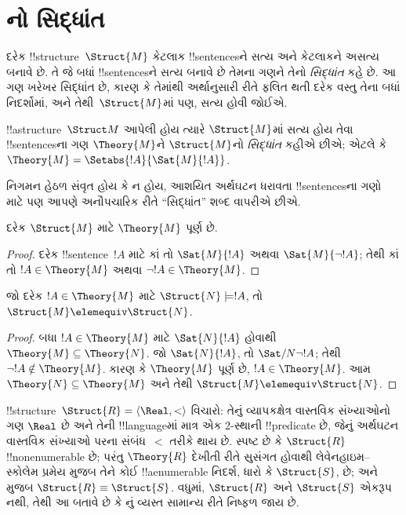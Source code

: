 \documentclass[../../../include/open-logic-section]{subfiles}
\begin{document}

\section{નો સિદ્ધાંત}

દરેક !!{structure}~$\Struct{M}$ કેટલાક !!{sentence}sને સત્ય અને
કેટલાકને અસત્ય બનાવે છે. તે જે બધાં !!{sentence}sને સત્ય બનાવે છે
તેમના ગણને તેનો \emph{સિદ્ધાંત} કહે છે. આ ગણ ખરેખર સિદ્ધાંત છે, કારણ કે
તેમાંથી અર્થાનુસારી રીતે ફલિત થતી દરેક વસ્તુ તેના બધાં નિદર્શોમાં,
અને તેથી~$\Struct{M}$માં પણ, સત્ય હોવી જોઈએ.

\begin{defn}
  !!a{structure}~$\Struct M$ આપેલી હોય ત્યારે $\Struct{M}$માં સત્ય
  હોય તેવા !!{sentence}sના ગણ $\Theory{M}$ને $\Struct{M}$નો
  \emph{સિદ્ધાંત} કહીએ છીએ; એટલે કે $\Theory{M} =
  \Setabs{!A}{\Sat{M}{!A}}$.
\end{defn}

નિગમન હેઠળ સંવૃત હોય કે ન હોય, આશયિત અર્થઘટન ધરાવતા
!!{sentence}sના ગણો માટે પણ આપણે અનૌપચારિક રીતે ``સિદ્ધાંત'' શબ્દ વાપરીએ છીએ.

\begin{prop}
દરેક $\Struct{M}$ માટે $\Theory{M}$ પૂર્ણ છે.
\end{prop}

\begin{proof}
દરેક !!{sentence}~$!A$ માટે કાં તો $\Sat{M}{!A}$ અથવા
$\Sat{M}{\lnot !A}$; તેથી કાં તો $!A \in \Theory{M}$ અથવા
$\lnot !A \in \Theory{M}$.
\end{proof}

\begin{prop}
  જો દરેક $!A \in \Theory{M}$ માટે $\Struct{N} \models !A$, તો
  $\Struct{M} \elemequiv \Struct{N}$.
\end{prop}

\begin{proof}
બધા $!A \in \Theory{M}$ માટે $\Sat{N}{!A}$ હોવાથી $\Theory{M}
\subseteq \Theory{N}$. જો $\Sat{N}{!A}$, તો
$\Sat/{N}{\lnot !A}$; તેથી $\lnot !A \notin \Theory{M}$. કારણ કે
$\Theory{M}$ પૂર્ણ છે, $!A \in \Theory{M}$. આમ $\Theory{N}
\subseteq \Theory{M}$ અને તેથી $\Struct{M} \elemequiv \Struct{N}$.
\end{proof}

\begin{rem}
  !!{structure}~$\Struct{R} = \langle\Real, <\rangle$ વિચારો: તેનું
  વ્યાપકક્ષેત્ર વાસ્તવિક સંખ્યાઓનો ગણ $\Real$ છે અને તેની !!{language}માં માત્ર એક
  2-સ્થાની !!{predicate} છે, જેનું અર્થઘટન વાસ્તવિક સંખ્યાઓ પરના
  સંબંધ~$<$ તરીકે થાય છે. સ્પષ્ટ છે કે $\Struct{R}$ !!{nonenumerable}
  છે; પરંતુ $\Theory{R}$ દેખીતી રીતે સુસંગત હોવાથી લેવેનહાઇમ--સ્કોલેમ
  પ્રમેય મુજબ તેને કોઈ !!a{enumerable} નિદર્શ, ધારો કે $\Struct{S}$,
  છે; અને  મુજબ $\Struct{R} \equiv \Struct{S}$.
  વધુમાં, $\Struct{R}$ અને $\Struct{S}$ એકરૂપ નથી, તેથી આ બતાવે છે કે
  નું વ્યસ્ત સામાન્ય રીતે નિષ્ફળ જાય છે.
\end{rem}
\end{document}
